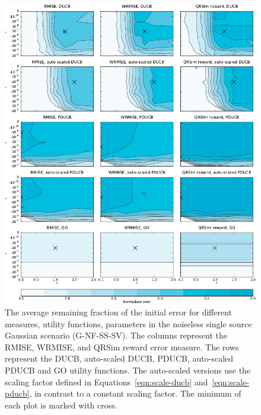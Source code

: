 \begin{figure}
    \centering
    \includegraphics{plots/psearch-G-NF-SS-SV}
    \caption[Remaining fraction of the initial error (G-NF-SS-SV)]{The average 
        remaining fraction of the initial error for different measures, utility 
        functions, parameters in the noiseless single source Gaussian scenario 
        (G-NF-SS-SV).  The columns represent the RMISE, WRMISE, and QRSim reward 
        error measure.  The rows represent the DUCB, auto-scaled DUCB, PDUCB, 
        auto-scaled PDUCB and GO utility functions. The auto-scaled versions use 
        the scaling factor defined in Equations~\ref{eqn:scale-ducb} 
        and~\ref{eqn:scale-pducb}, in contrast to a constant scaling factor. The 
        minimum of each plot is marked with 
        cross.}\label{fig:psearch-G-NF-SS-SV}
\end{figure}

